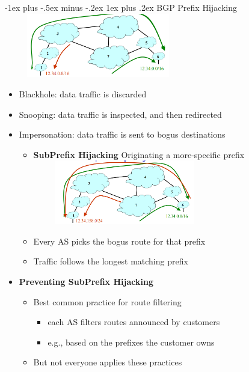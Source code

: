 \documentclass[10pt,landscape]{article}
\makeatletter
\newcommand{\subsubsubsection}{\@startsection{subsubsection}{3}{0mm}%
                                {-1ex plus -.5ex minus -.2ex}%
                                {1ex plus .2ex}%
                                {\normalfont\scriptsize\bfseries}}
\makeatother
\begin{document}
\begin{multicols*}{3}
\subsubsubsection{BGP Prefix Hijacking}
\includegraphics*[width=8.2cm, height=2.8cm]{images/bgpprefix.PNG}
\begin{itemize}[topsep=0pt,noitemsep,wide=0pt, leftmargin=\dimexpr{} + 2\relax]
  \item Blackhole: data traffic is discarded
  \item Snooping: data traffic is inspected, and then redirected
  \item Impersonation: data traffic is sent to bogus destinations
  \begin{itemize}[topsep=0pt,noitemsep,wide=0pt, leftmargin=\dimexpr{} + 2\relax]
    \item \textbf{SubPrefix Hijacking} Originating a more-specific prefix
    \includegraphics*[width=8cm, height=2.8cm]{images/bgpsubprefix.PNG}
    \item Every AS picks the bogus route for that prefix
    \item Traffic follows the longest matching prefix
  \end{itemize}
  \item \textbf{Preventing SubPrefix Hijacking}
  \begin{itemize}[topsep=0pt,noitemsep,wide=0pt, leftmargin=\dimexpr{} + 2\relax]
    \item Best common practice for route filtering
    \begin{itemize}[topsep=0pt,noitemsep,wide=0pt, leftmargin=\dimexpr{} + 2\relax]
      \item each AS filters routes announced by customers
      \item e.g., based on the prefixes the customer owns
    \end{itemize}
    \item But not everyone applies these practices
    \begin{itemize}[topsep=0pt,noitemsep,wide=0pt, leftmargin=\dimexpr{} + 2\relax]

\end{itemize}
\end{itemize}
\end{itemize}
\end{multicols*}
\end{document}
